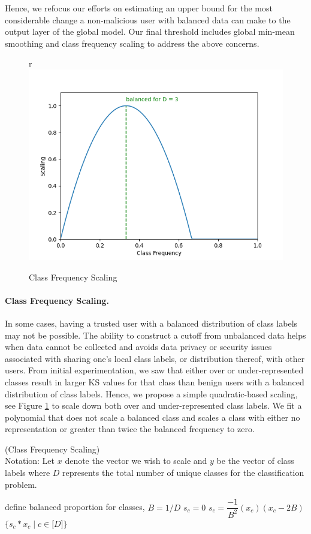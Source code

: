\documentclass{article} %
\begin{document}
Hence, we refocus our efforts on estimating an upper bound for the most considerable change a non-malicious user with balanced data can make to the output layer of the global model. Our final threshold includes global min-mean smoothing and class frequency scaling to address the above concerns.

%

\begin{figure}{r}
    \centering
    \includegraphics[width=.4\textwidth]{make_article/make_visuals/visuals/scaling.png}
    \caption{Class Frequency Scaling}
    \label{fig:scaling}
\end{figure}

\paragraph{Class Frequency Scaling.} In some cases, having a trusted user with a balanced distribution of class labels may not be possible. The ability to construct a cutoff from unbalanced data helps when data cannot be collected and avoids data privacy or security issues associated with sharing one's local class labels, or distribution thereof, with other users. From initial experimentation, we saw that either over or under-represented classes result in larger KS values for that class than benign users with a balanced distribution of class labels. Hence, we propose a simple quadratic-based scaling, see Figure \ref{fig:scaling} to scale down both over and under-represented class labels. We fit a polynomial that does not scale a balanced class and scales a class with either no representation or greater than twice the balanced frequency to zero.

\begin{algorithm}[H]
\caption{ (Class Frequency Scaling) \\ 
Notation: Let $x$ denote the vector we wish to scale and $y$ be the vector of class labels where $D$ represents the total number of unique classes for the classification problem. 
}
\label{alg:scaling}
\begin{algorithmic}[1]
    \State define balanced proportion for classes, $B = 1/D$
                \State $s_c = 0$
            \Else
                \State $s_c = \dfrac{-1}{B^2}(x_c)(x_c - 2B)$
            \EndIf
        \EndFor
    \State \Return $\{s_c * x_c \mid c \in \mathopen[ D \mathclose] \}$
    \EndProcedure
\end{algorithmic}
\end{algorithm}
\end{document}
